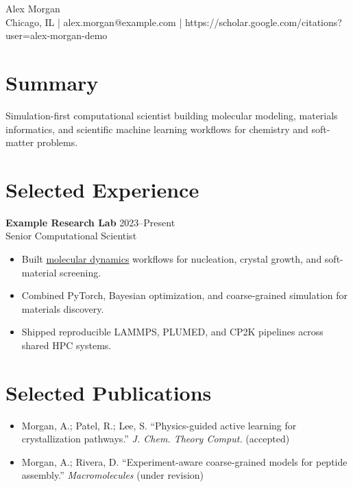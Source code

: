 \documentclass[10pt]{article}
\begin{document}
\begin{center}
  {\LARGE Alex Morgan}\\
  Chicago, IL \quad | \quad alex.morgan@example.com \quad | \quad
  https://scholar.google.com/citations?user=alex-morgan-demo
\end{center}

\section*{Summary}
Simulation-first computational scientist building molecular modeling, materials informatics,
and scientific machine learning workflows for chemistry and soft-matter problems.

\section*{Selected Experience}
\textbf{Example Research Lab} \hfill 2023--Present\\
Senior Computational Scientist
\begin{itemize}
  \item Built \underline{molecular dynamics} workflows for nucleation, crystal growth, and soft-material screening.
  \item Combined PyTorch, Bayesian optimization, and coarse-grained simulation for materials discovery.
  \item Shipped reproducible LAMMPS, PLUMED, and CP2K pipelines across shared HPC systems.
\end{itemize}

\section*{Selected Publications}
\begin{itemize}
  \item Morgan, A.; Patel, R.; Lee, S. ``Physics-guided active learning for crystallization pathways.'' \textit{J. Chem. Theory Comput.} (accepted)
  \item Morgan, A.; Rivera, D. ``Experiment-aware coarse-grained models for peptide assembly.'' \textit{Macromolecules} (under revision)
\end{itemize}
\end{document}
